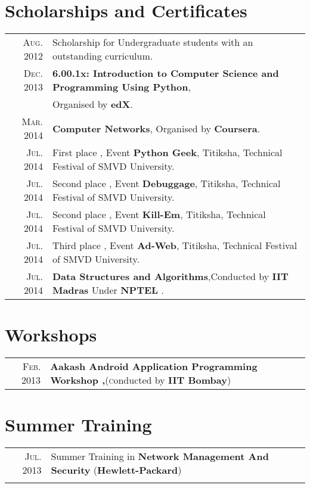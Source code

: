 \documentclass[a4paper,10pt]{article}
\begin{document}
\section{Scholarships and Certificates}
\begin{tabular}{rl}
 \textsc{Aug.} 2012 & Scholarship for Undergraduate students with an outstanding curriculum. \normalsize\\
 \textsc{Dec.} 2013 & \normalsize\textbf{6.00.1x: Introduction to Computer Science and Programming Using Python},\\ & Organised by \normalsize\textbf{edX}.\\
 \textsc{Mar.} 2014 & \normalsize\textbf{Computer Networks}, Organised by \normalsize\textbf{Coursera}.\\
 \textsc{Jul.} 2014 & First place , Event \normalsize\textbf{Python Geek}, Titiksha, Technical Festival of SMVD University.\normalsize\\
 \textsc{Jul.} 2014 & Second place , Event \normalsize\textbf{Debuggage}, Titiksha, Technical Festival of SMVD University.\normalsize\\
 \textsc{Jul.} 2014 & Second place , Event \normalsize\textbf{Kill-Em}, Titiksha, Technical Festival of SMVD University.\normalsize\\
 \textsc{Jul.} 2014 & Third place , Event \normalsize\textbf{Ad-Web}, Titiksha, Technical Festival of SMVD University.\normalsize\\
 \textsc{Jul.} 2014 & \normalsize\textbf{Data Structures and Algorithms},Conducted by  \normalsize\textbf{IIT Madras} Under  \normalsize\textbf{NPTEL} .\normalsize\\
\end{tabular}


\section{Workshops}
\begin{tabular}{rl}
 \textsc{Feb.} 2013 & {\normalsize\textbf{Aakash Android Application Programming Workshop ,}}(\textsc conducted by \normalsize\textbf{IIT Bombay})\\
\end{tabular}

\section{Summer Training}
\begin{tabular}{rl}
 \textsc{Jul.} 2013 & Summer Training in \normalsize\textbf{Network Management And Security} (\normalsize\textbf{Hewlett-Packard})\normalsize\\ & \\
 
\end{tabular}
\end{document}
